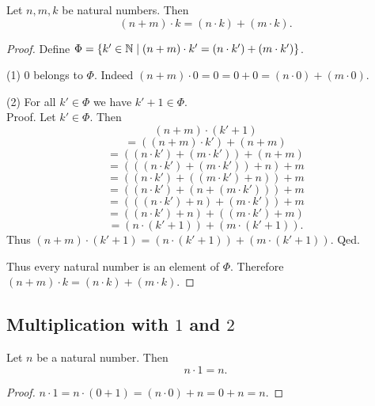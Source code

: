 \documentclass[../arithmetic.tex]{subfiles}
\begin{document}
  \begin{forthel}
    \begin{proposition}
      Let $n, m, k$ be natural numbers.
      Then \[ (n \plus m) \cdot k = (n \cdot k) \plus (m \cdot k). \]
    \end{proposition}
    \begin{proof}
      Define $\Phi = \{ k' \in \mathbb{N} \mid (n + m) \cdot k' =
      (n \cdot k') + (m \cdot k') \}$.

      (1) $0$ belongs to $\Phi$.
      Indeed $(n \plus m) \cdot 0
        = 0
        = 0 \plus 0
        = (n \cdot 0) \plus (m \cdot 0)$.

      (2) For all $k' \in \Phi$ we have $k' \plus 1 \in \Phi$. \\
      Proof.
        Let $k' \in \Phi$.
        Then
        \[  (n \plus m) \cdot (k' \plus 1)                        \]
        \[    = ((n \plus m) \cdot k') \plus (n \plus m)              \]
        \[    = ((n \cdot k') \plus (m \cdot k')) \plus (n \plus m)   \]
        \[    = (((n \cdot k') \plus (m \cdot k')) \plus n) \plus m   \]
        \[    = ((n \cdot k') \plus ((m \cdot k') \plus n)) \plus m   \]
        \[    = ((n \cdot k') \plus (n \plus (m \cdot k'))) \plus m   \]
        \[    = (((n \cdot k') \plus n) \plus (m \cdot k')) \plus m   \]
        \[    = ((n \cdot k') \plus n) \plus ((m \cdot k') \plus m)   \]
        \[    = (n \cdot (k' \plus 1)) \plus (m \cdot (k' \plus 1)).  \]
        Thus $(n \plus m) \cdot (k' \plus 1) = (n \cdot (k' \plus 1)) \plus (m \cdot (k' \plus 1))$.
      Qed.

      Thus every natural number is an element of $\Phi$.
      Therefore $(n \plus m) \cdot k = (n \cdot k) \plus (m \cdot k)$.
    \end{proof}
  \end{forthel}


  \subsection*{Multiplication with $1$ and $2$}

  \begin{forthel}
    \begin{proposition}
      Let $n$ be a natural number.
      Then \[ n \cdot 1 = n. \]
    \end{proposition}
    \begin{proof}
      $n \cdot 1
        = n \cdot (0 \plus 1)
        = (n \cdot 0) \plus n
        = 0 \plus n
        = n$.
    \end{proof}
  \end{forthel}
\end{document}

